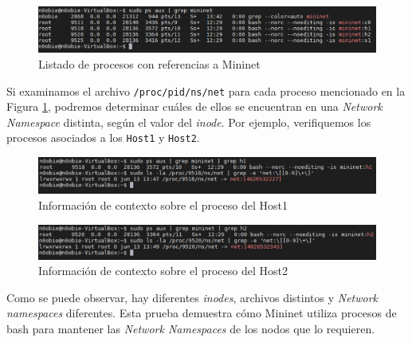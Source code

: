 \begin{figure}[ht]
    \centering
    \includegraphics[width=\textwidth]{archivos/img/teoria/mn_03.png}
    \caption{Listado de procesos con referencias a Mininet}
    \label{fig:mininet_03}
\end{figure}

Si examinamos el archivo \texttt{/proc/{pid}/ns/net} para cada proceso mencionado en la Figura \ref{fig:mininet_03}, podremos determinar cuáles de ellos se encuentran en una \textit{Network Namespace} distinta, según el valor del \textit{inode}. Por ejemplo, verifiquemos los procesos asociados a los \texttt{Host1} y \texttt{Host2}.\\


\begin{figure}[ht]
    \centering
    \includegraphics[width=\textwidth]{archivos/img/teoria/mn_04.png}
    \caption{Información de contexto sobre el proceso del Host1}
    \label{fig:mininet_04}
\end{figure}

\newpage

\begin{figure}[ht]
    \centering
    \includegraphics[width=\textwidth]{archivos/img/teoria/mn_05.png}
    \caption{Información de contexto sobre el proceso del Host2}
    \label{fig:mininet_05}
\end{figure}

Como se puede observar, hay diferentes \textit{inodes}, archivos distintos y \textit{Network namespaces} diferentes. Esta prueba demuestra cómo Mininet utiliza procesos de bash para mantener las \textit{Network Namespaces} de los nodos que lo requieren.


